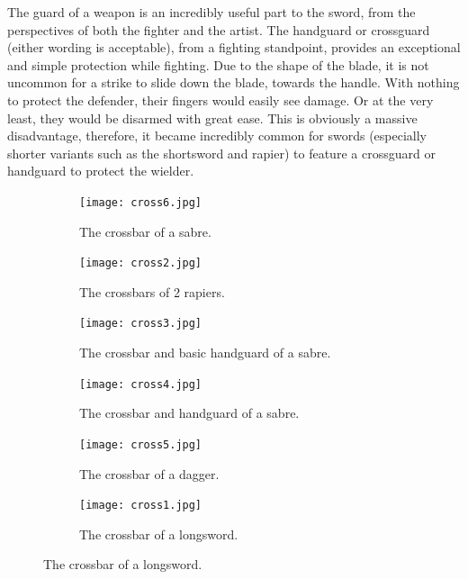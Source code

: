 \documentclass{article}
\begin{document}
The guard of a weapon is an incredibly useful part to the sword, from the perspectives of both the fighter and the artist. The handguard or crossguard (either wording is acceptable), from a fighting standpoint, provides an exceptional and simple protection while fighting. Due to the shape of the blade, it is not uncommon for a strike to slide down the blade, towards the handle. With nothing to protect the defender, their fingers would easily see damage. Or at the very least, they would be disarmed with great ease. This is obviously a massive disadvantage, therefore, it became incredibly common for swords (especially shorter variants such as the shortsword and rapier) to feature a crossguard or handguard to protect the wielder.

\begin{figure}[H]
    \centering
    \caption{A collection of crossguards from various blades}
    \label{fig:Crossguards}
    \begin{subfigure}{0.3\textwidth}
        \centering
        \texttt{[image: cross6.jpg]}
        \caption{The crossbar of a sabre.}
        \label{fig:Cross1}
    \end{subfigure}
        \begin{subfigure}{0.3\textwidth}
        \centering
        \texttt{[image: cross2.jpg]}
        \caption{The crossbars of 2 rapiers.}
        \label{fig:Cross2}
    \end{subfigure}
        \begin{subfigure}{0.3\textwidth}
        \centering
        \texttt{[image: cross3.jpg]}
        \caption{The crossbar and basic handguard of a sabre.}
        \label{fig:Cross3}
    \end{subfigure}
        \begin{subfigure}{0.3\textwidth}
        \centering
        \texttt{[image: cross4.jpg]}
        \caption{The crossbar and handguard of a sabre.}
        \label{fig:Cross4}
    \end{subfigure}
        \begin{subfigure}{0.3\textwidth}
        \centering
        \texttt{[image: cross5.jpg]}
        \caption{The crossbar of a dagger.}
        \label{fig:Cross5}
    \end{subfigure}
        \begin{subfigure}{0.3\textwidth}
        \centering
        \texttt{[image: cross1.jpg]}
        \caption{The crossbar of a longsword.}
        \label{fig:Cross6}
    \end{subfigure}
\end{figure}
\end{document}
